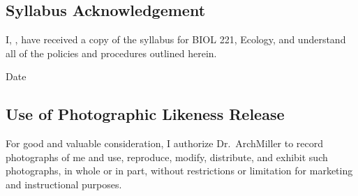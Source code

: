 \documentclass{tufte-handout}
\begin{document}
\begin{fullwidth}
%
%
%
%
%
%
%
%
%
%



\end{fullwidth}



\newpage

\subsection{Syllabus Acknowledgement}

I, \underline{\hspace{5cm}}, have received a copy of the syllabus for BIOL 221, Ecology, and understand all of the policies and procedures outlined herein. 

  \underline{\hspace{5cm}} {Date}  \hrulefill


\subsection{Use of Photographic Likeness Release}

For good and valuable consideration, I authorize Dr.~ArchMiller to record photographs of me and use, reproduce, modify, distribute, and exhibit such photographs, in whole or in part, without restrictions or limitation for marketing and instructional purposes. 
\end{document}
